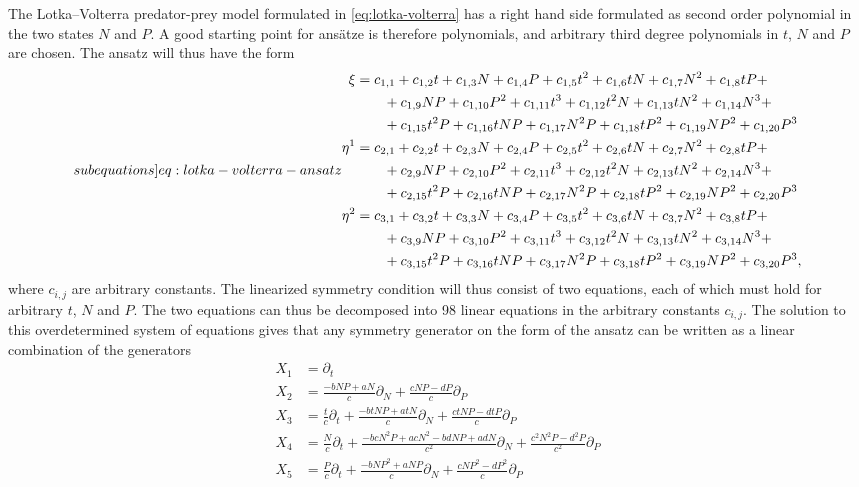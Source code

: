The Lotka--Volterra predator-prey model formulated in \cref{eq:lotka-volterra} has a right hand side formulated as second order polynomial in the two states \(N\) and \(P\).
A good starting point for ansätze is therefore polynomials, and arbitrary third degree polynomials in \(t\), \(N\) and \(P\) are chosen.
The ansatz will thus have the form
\begin{subequations} \label[subequations]{eq:lotka-volterra-ansatz}
  \begin{align}
    \xi &= c_{1,1} + c_{1,2}t + c_{1,3}N + c_{1,4}P + c_{1,5}t^{2} + c_{1,6}tN + c_{1,7}N^{2} + c_{1,8}tP + \\ & \qquad + c_{1,9}NP + c_{1,10}P^{2} + c_{1,11}t^{3} + c_{1,12}t^{2}N + c_{1,13}tN^{2} + c_{1,14}N^{3} + \\ & \qquad + c_{1,15}t^{2}P + c_{1,16}tNP + c_{1,17}N^{2}P + c_{1,18}tP^{2} + c_{1,19}NP^{2} + c_{1,20}P^{3} \\
    \eta^{1} &= c_{2,1} + c_{2,2}t + c_{2,3}N + c_{2,4}P + c_{2,5}t^{2} + c_{2,6}tN + c_{2,7}N^{2} + c_{2,8}tP + \\ & \qquad + c_{2,9}NP + c_{2,10}P^{2} + c_{2,11}t^{3} + c_{2,12}t^{2}N + c_{2,13}tN^{2} + c_{2,14}N^{3} + \\ & \qquad + c_{2,15}t^{2}P + c_{2,16}tNP + c_{2,17}N^{2}P + c_{2,18}tP^{2} + c_{2,19}NP^{2} + c_{2,20}P^{3} \\
    \eta^{2} &= c_{3,1} + c_{3,2}t + c_{3,3}N + c_{3,4}P + c_{3,5}t^{2} + c_{3,6}tN + c_{3,7}N^{2} + c_{3,8}tP + \\ & \qquad + c_{3,9}NP + c_{3,10}P^{2} + c_{3,11}t^{3} + c_{3,12}t^{2}N + c_{3,13}tN^{2} + c_{3,14}N^{3} + \\ & \qquad + c_{3,15}t^{2}P + c_{3,16}tNP + c_{3,17}N^{2}P + c_{3,18}tP^{2} + c_{3,19}NP^{2} + c_{3,20}P^{3},
  \end{align}
\end{subequations}
where \(c_{i,j}\) are arbitrary constants.
The linearized symmetry condition will thus consist of two equations, each of which must hold for arbitrary \(t\), \(N\) and \(P\).
The two equations can thus be decomposed into 98 linear equations in the arbitrary constants \(c_{i,j}\).
The solution to this overdetermined system of equations gives that any symmetry generator on the form of the ansatz can be written as a linear combination of the generators
\begin{align*}
  X_1 &= \partial_t \\
  X_2 &= \frac{-bNP + aN}{c} \partial_N + \frac{cNP - dP}{c} \partial_P \\
  X_3 &= \frac{t}{c} \partial_t + \frac{-btNP + atN}{c} \partial_N + \frac{ctNP - dtP}{c} \partial_P \\
  X_4 &= \frac{N}{c} \partial_t + \frac{-bcN^2P + acN^2 - bdNP + adN}{c^2} \partial_N + \frac{c^2N^2P - d^2P}{c^2} \partial_P \\
  X_5 &= \frac{P}{c} \partial_t + \frac{-bNP^2 + aNP}{c} \partial_N + \frac{cNP^2 - dP^2}{c} \partial_P
\end{align*}

